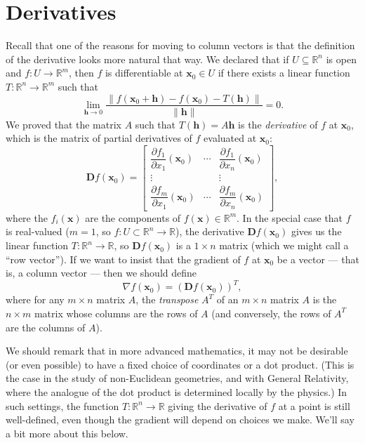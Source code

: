 \documentclass[12pt,letterpaper]{article}
\newcommand{\R}{\mathbb{R}}
\newcommand{\D}{\mathbf{D}}
\newcommand{\x}{\mathbf{x}}
\begin{document}
\section{Derivatives}
Recall that one of the reasons for moving to column vectors is that the definition of the derivative looks more natural that way. We declared that if $U\subseteq \R^n$ is open and $f:U\to \R^m$, then $f$ is differentiable at $\x_0\in U$ if there exists a linear function $T:\R^n\to \R^m$ such that
\[
 \lim_{\mathbf{h}\to 0}\frac{\lVert f(\x_0+\mathbf{h})-f(\x_0) - T(\mathbf{h})\rVert}{\lVert\mathbf{h}\rVert} = 0.
\]
We proved that the matrix $A$ such that $T(\mathbf{h}) = A\mathbf{h}$ is the {\em derivative} of $f$ at $\x_0$, which is the matrix of partial derivatives of $f$ evaluated at $\x_0$:
\[
 \D f(\x_0) = \begin{bmatrix}
               \dfrac{\partial f_1}{\partial x_1}(\x_0)& \cdots &\dfrac{\partial f_1}{\partial x_n}(\x_0)\\
	       \vdots & & \vdots\\
	       \dfrac{\partial f_m}{\partial x_1}(\x_0)& \cdots &\dfrac{\partial f_m}{\partial x_n}(\x_0)
              \end{bmatrix},
\]
where the $f_i(\x)$ are the components of $f(\x)\in \R^m$. In the special case that $f$ is real-valued ($m=1$, so $f:U\subset \R^n\to \R$), the derivative $\D f(\x_0)$ gives us the linear function $T:\R^n\to\R$, so $\D f(\x_0)$ is a $1\times n$ matrix (which we might call a ``row vector''). If we want to insist that the gradient of $f$ at $\x_0$ be a vector --- that is, a column vector --- then we should define
\[
 \nabla f(\x_0) = (\D f(\x_0))^T,
\]
where for any $m\times n$ matrix $A$, the {\em transpose} $A^T$ of an $m\times n$ matrix $A$ is the $n\times m$ matrix whose columns are the rows of $A$ (and conversely, the rows of $A^T$ are the columns of $A$).

We should remark that in more advanced mathematics, it may not be desirable (or even possible) to have a fixed choice of coordinates or a dot product. (This is the case in the study of non-Euclidean geometries, and with General Relativity, where the analogue of the dot product is determined locally by the physics.) In such settings, the function $T:\R^n\to \R$ giving the derivative of $f$ at a point is still well-defined, even though the gradient will depend on choices we make. We'll say a bit more about this below.
\end{document}

